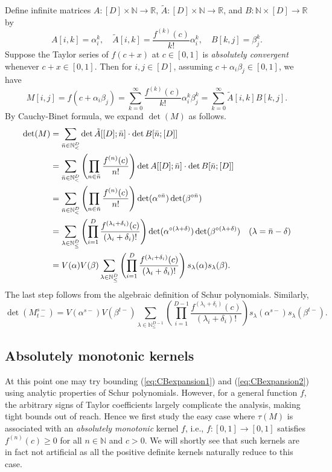 \documentclass[10pt,a4paper]{article}
\theoremstyle{remark}
\numberwithin{equation}{section}
\numberwithin{theorem}{section}
\newcommand{\N}{\ensuremath{\mathbb{N}}}
\newcommand{\R}{\ensuremath{\mathbb{R}}}
\newcommand{\bn}{\bar {n}}
\begin{document}
Define infinite matrices $A: [D] \times \N \rightarrow \R$,
$\tilde A: [D] \times \N \rightarrow \R$, and $B: \N \times [D] \rightarrow \R$ by
\[A[i, k] = \alpha_i^k, \quad
\tilde A[i, k] = \frac{f^{(k)}(c)}{k!}\alpha_i^k, \quad B[k, j] = \beta_j^k.\]
Suppose the Taylor series of $f(c + x)$ at $c \in [0, 1]$ is \emph{absolutely convergent} whenever $c + x \in [0, 1]$. Then for $i, j \in [D]$, assuming $c + \alpha_i \beta_j \in [0, 1]$, we have
\[M[i, j] = f(c + \alpha_i\beta_j)
= \sum_{k=0}^{\infty} \frac{f^{(k)}(c)}{k!}\alpha_i^k \beta_j^k
=\sum_{k=0}^{\infty}\tilde A[i, k]B[k, j].\]
By Cauchy-Binet formula, we expand $\det(M)$ as follows.
\begin{align}
\det(M) &= \sum_{\bn \in \N^D_<} \det \tilde A[[D]; \bn] \cdot \det B[\bn; [D]] \notag\\
&=\sum_{\bn \in \N^D_<} \left(\prod_{n\in \bn} \frac{f^{(n)}(c)}{n!}\right)
\det A[[D]; \bn] \cdot \det B[\bn; [D]]  \notag\\
&=\sum_{\bn \in \N^D_<} \left(\prod_{n\in \bn} \frac{f^{(n)}(c)}{n!}\right)
\det (\alpha^{\circ \bn})\det (\beta^{\circ \bn}) \notag\\
&=\sum_{\lambda \in \N^D_{\le}}
\left(\prod_{i=1}^D \frac{f^{(\lambda_i + \delta_i)}(c)}{(\lambda_i + \delta_i)!}\right)
\det (\alpha^{\circ (\lambda + \delta)})\det (\beta^{\circ (\lambda + \delta)})
\quad (\lambda = \bn - \delta) \notag\\
&=V(\alpha)V(\beta) \sum_{\lambda \in \N^D_{\le}}
\left(\prod_{i=1}^D \frac{f^{(\lambda_i + \delta_i)}(c)}{(\lambda_i + \delta_i)!}\right)
s_{\lambda}(\alpha)s_{\lambda}(\beta). \label{eq:CBexpansion1} 
\end{align}
The last step follows from the algebraic definition of Schur polynomials. Similarly,
\begin{equation}
\det(M_{t-}^{s-}) = V(\alpha^{s-})V(\beta^{t-}) \sum_{\lambda \in \N^{D-1}_{\le}}
\left(\prod_{i=1}^{D-1} \frac{f^{(\lambda_i + \delta_i)}(c)}{(\lambda_i + \delta_i)!}\right)
s_{\lambda}(\alpha^{s-})s_{\lambda}(\beta^{t-}). \label{eq:CBexpansion2}
\end{equation}

\subsection{Absolutely monotonic kernels}
At this point one may try bounding (\ref{eq:CBexpansion1}) and (\ref{eq:CBexpansion2}) using analytic properties of Schur polynomials. However, for a general function $f$, the arbitrary signs of Taylor coefficients largely complicate the analysis, making tight bounds out of reach.
Hence we first study the easy case where $\tau(M)$ is associated with an \emph{absolutely monotonic} kernel $f$, i.e., $f:[0, 1]\rightarrow [0, 1]$ satisfies $f^{(n)}(c) \ge 0$ for all $n \in \N$ and $c > 0$. We will shortly see that such kernels are in fact not artificial as all the positive definite kernels naturally reduce to this case.
\end{document}
